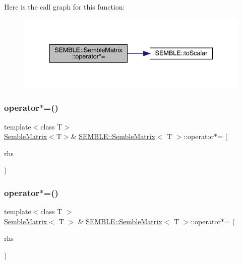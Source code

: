 Here is the call graph for this function\+:
\nopagebreak
\begin{figure}[H]
\begin{center}
\leavevmode
\includegraphics[width=338pt]{df/d87/structSEMBLE_1_1SembleMatrix_a9da9280a327b75bb2a7d58080ef6aa59_cgraph}
\end{center}
\end{figure}
\mbox{\label{structSEMBLE_1_1SembleMatrix_a3ef3830b0983652f9a25811ab7180357}} 
\subsubsection{\texorpdfstring{operator$\ast$=()}{operator*=()}\hspace{0.1cm}{\footnotesize\ttfamily [4/10]}}
{\footnotesize\ttfamily template$<$class T$>$ \\
\mbox{\hyperlink{structSEMBLE_1_1SembleMatrix}{Semble\+Matrix}}$<$T$>$\& \mbox{\hyperlink{structSEMBLE_1_1SembleMatrix}{S\+E\+M\+B\+L\+E\+::\+Semble\+Matrix}}$<$ T $>$\+::operator$\ast$= (\begin{DoxyParamCaption}\item[{const typename \mbox{\hyperlink{structSEMBLE_1_1PromoteScalar}{Promote\+Scalar}}$<$ T $>$\+::Type \&}]{rhs }\end{DoxyParamCaption})}

\mbox{\label{structSEMBLE_1_1SembleMatrix_a0170ab204b392638e23a215fe9943cd5}} 
\subsubsection{\texorpdfstring{operator$\ast$=()}{operator*=()}\hspace{0.1cm}{\footnotesize\ttfamily [5/10]}}
{\footnotesize\ttfamily template$<$class T $>$ \\
\mbox{\hyperlink{structSEMBLE_1_1SembleMatrix}{Semble\+Matrix}}$<$ T $>$ \& \mbox{\hyperlink{structSEMBLE_1_1SembleMatrix}{S\+E\+M\+B\+L\+E\+::\+Semble\+Matrix}}$<$ T $>$\+::operator$\ast$= (\begin{DoxyParamCaption}\item[{const typename \mbox{\hyperlink{structSEMBLE_1_1PromoteEnsem}{Promote\+Ensem}}$<$ T $>$\+::Type \&}]{rhs }\end{DoxyParamCaption})}

